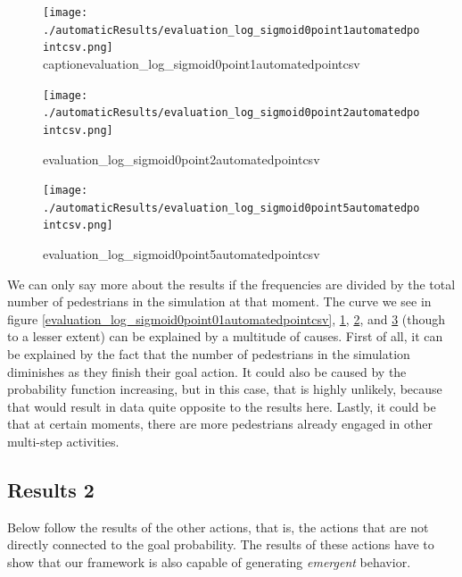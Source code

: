 \documentclass[11pt]{book}
\begin{document}
\begin{figure}
\centering
\texttt{[image: ./automaticResults/evaluation\_log\_sigmoid0point1automatedpointcsv.png]}
caption{evaluation\_log\_sigmoid0point1automatedpointcsv}
\label{evaluation_log_sigmoid0point1automatedpointcsv}
\end{figure}

\begin{figure}
\centering
\texttt{[image: ./automaticResults/evaluation\_log\_sigmoid0point2automatedpointcsv.png]}
\caption{evaluation\_log\_sigmoid0point2automatedpointcsv}
\label{evaluation_log_sigmoid0point2automatedpointcsv}
\end{figure}

\begin{figure}
\centering
\texttt{[image: ./automaticResults/evaluation\_log\_sigmoid0point5automatedpointcsv.png]}
\caption{evaluation\_log\_sigmoid0point5automatedpointcsv}
\label{evaluation_log_sigmoid0point5automatedpointcsv}
\end{figure}

We can only say more about the results if the frequencies are divided by the total number of pedestrians in the simulation at that moment. The curve we see in figure \ref{evaluation_log_sigmoid0point01automatedpointcsv}, \ref{evaluation_log_sigmoid0point1automatedpointcsv}, \ref{evaluation_log_sigmoid0point2automatedpointcsv}, and \ref{evaluation_log_sigmoid0point5automatedpointcsv} (though to a lesser extent) can be explained by a multitude of causes. First of all, it can be explained by the fact that the number of pedestrians in the simulation diminishes as they finish their goal action. It could also be caused by the probability function increasing, but in this case, that is highly unlikely, because that would result in data quite opposite to the results here. Lastly, it could be that at certain moments, there are more pedestrians already engaged in other multi-step activities.


\subsection{Results 2}
Below follow the results of the other actions, that is, the actions that are not directly connected to the goal probability. The results of these actions have to show that our framework is also capable of generating \emph{emergent} behavior.
\end{document}
